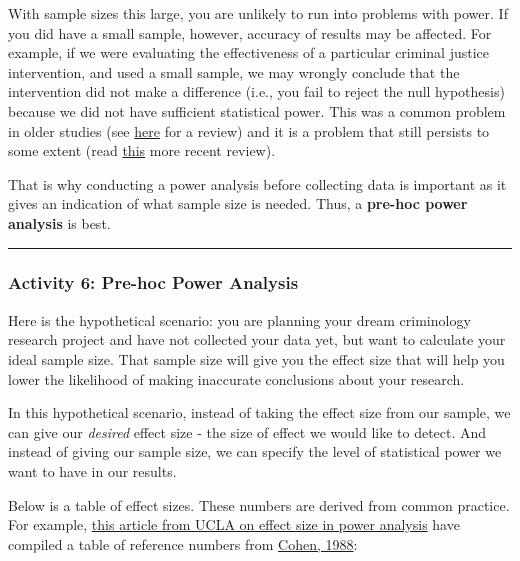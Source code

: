 \documentclass[
]{book}
\begin{document}
With sample sizes this large, you are unlikely to run into problems with power. If you did have a small sample, however, accuracy of results may be affected. For example, if we were evaluating the effectiveness of a particular criminal justice intervention, and used a small sample, we may wrongly conclude that the intervention did not make a difference (i.e., you fail to reject the null hypothesis) because we did not have sufficient statistical power. This was a common problem in older studies (see \href{https://www.sciencedirect.com/science/article/pii/0047235289900044}{here} for a review) and it is a problem that still persists to some extent (read \href{https://www.tandfonline.com/doi/abs/10.1080/07418825.2018.1495252}{this} more recent review).

That is why conducting a power analysis before collecting data is important as it gives an indication of what sample size is needed. Thus, a \textbf{pre-hoc power analysis} is best.

\begin{center}\rule{0.5\linewidth}{0.5pt}\end{center}

\hypertarget{activity-6-pre-hoc-power-analysis}{%
\subsubsection{Activity 6: Pre-hoc Power Analysis}\label{activity-6-pre-hoc-power-analysis}}

Here is the hypothetical scenario: you are planning your dream criminology research project and have not collected your data yet, but want to calculate your ideal sample size. That sample size will give you the effect size that will help you lower the likelihood of making inaccurate conclusions about your research.

In this hypothetical scenario, instead of taking the effect size from our sample, we can give our \emph{desired} effect size - the size of effect we would like to detect. And instead of giving our sample size, we can specify the level of statistical power we want to have in our results.

Below is a table of effect sizes. These numbers are derived from common practice. For example, \href{https://stats.idre.ucla.edu/other/mult-pkg/faq/general/effect-size-power/faqhow-is-effect-size-used-in-power-analysis/}{this article from UCLA on effect size in power analysis} have compiled a table of reference numbers from \href{http://www.utstat.toronto.edu/~brunner/oldclass/378f16/readings/CohenPower.pdf}{Cohen, 1988}:
\end{document}
